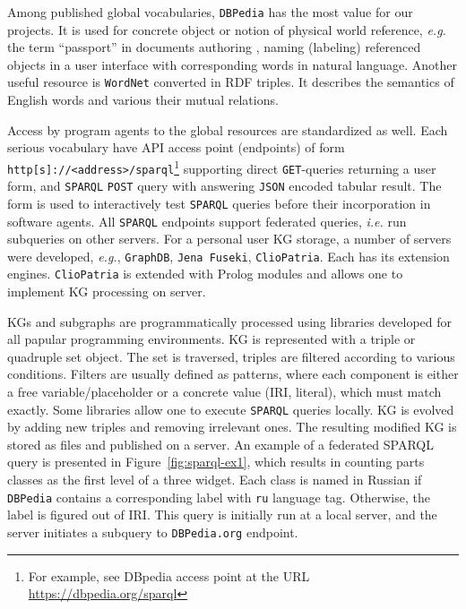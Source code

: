 \documentclass[
]{ceurart}
\begin{document}
Among published global vocabularies, \texttt{DBPedia} has the most value for our projects.  It is used for concrete object or notion of physical world reference, \emph{e.g.} the term ``passport'' in documents authoring \cite{zont19}, naming (labeling) referenced objects in a user interface with corresponding words in natural language.  Another useful resource is \texttt{WordNet} converted in RDF triples.  It describes the semantics of English words and various their mutual relations.

Access by program agents to the global resources are standardized as well.  Each serious vocabulary have API access point (endpoints) of form
\verb|http[s]://<address>/sparql|\footnote{For example, see DBpedia access point at the URL \url{https://dbpedia.org/sparql}} supporting direct \texttt{GET}-queries returning a user form, and \texttt{SPARQL} \texttt{POST} query with answering \texttt{JSON} encoded tabular result.  The form is used to interactively test \texttt{SPARQL} queries before their incorporation in software agents.  All \texttt{SPARQL} endpoints support federated queries, \emph{i.e.} run subqueries on other servers.   For a personal user KG storage, a number of servers were developed, \emph{e.g.}, \texttt{GraphDB}, \texttt{Jena Fuseki}, \texttt{ClioPatria}.  Each has its extension engines.  \texttt{ClioPatria} is extended with Prolog modules and allows one to implement KG processing on server.

KGs and subgraphs are programmatically processed using libraries developed for all papular programming environments.  KG is represented with a triple or quadruple set object.  The set is traversed, triples are filtered according to various conditions.  Filters are usually defined as patterns, where each component is either a free variable/placeholder or a concrete value (IRI, literal), which must match exactly.   Some libraries allow one to execute \texttt{SPARQL} queries locally.  KG is evolved by adding new triples and removing irrelevant ones.  The resulting modified KG is stored as files and published on a server.  An example of a federated SPARQL query is presented in Figure~\ref{fig:sparql-ex1}, which results in counting parts classes as the first level of a three widget.  Each class is named in Russian if \texttt{DBPedia} contains a corresponding label with \texttt{ru} language tag.  Otherwise, the label is figured out of IRI.  This query is initially run at a local server, and the server initiates a subquery to \texttt{DBPedia.org} endpoint.
\end{document}
